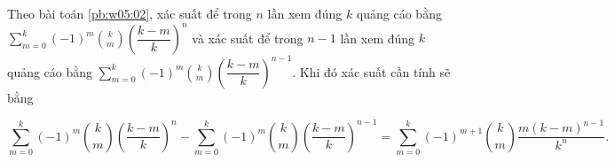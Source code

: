 Theo bài toán \ref{pb:w05:02}, xác suất để trong $n$ lần xem đúng $k$ quảng cáo bằng $\displaystyle\sum_{m=0}^k (-1)^{m}{k \choose m}\left(\dfrac{k-m}{k}\right)^n$ và xác suất để trong $n-1$ lần xem đúng $k$ quảng cáo bằng $\displaystyle\sum_{m=0}^k (-1)^{m}{k \choose m}\left(\dfrac{k-m}{k}\right)^{n-1}$. Khi đó xác suất cần tính sẽ bằng 

$$\sum_{m=0}^k (-1)^{m}{k \choose m}\left(\dfrac{k-m}{k}\right)^n - \sum_{m=0}^k (-1)^{m}{k \choose m}\left(\dfrac{k-m}{k}\right)^{n-1} = \sum_{m=0}^k (-1)^{m+1}{k \choose m}\dfrac{m(k-m)^{n-1}}{k^n}.$$


